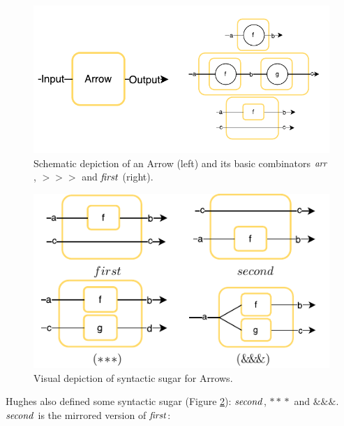 \documentclass[paper=A4,twoside=true,openright,parskip=full,chapterprefix=true,headings=normal,bibliography=totoc,listof=totoc,titlepage=on,captions=tableabove,draft=false,british]{scrreprt}%
\begin{document}
\begin{figure}
\centering
\includegraphics{src/img/arrows-viz.pdf}
\caption[Schematic depiction of an Arrow and its basic
combinators \ensuremath{\Varid{arr}}, \ensuremath{\mathbin{>\!\!>\!\!>}} and \ensuremath{\Varid{first}}.]{Schematic depiction of an Arrow (left) and its basic
combinators \ensuremath{\Varid{arr}}, \ensuremath{\mathbin{>\!\!>\!\!>}} and \ensuremath{\Varid{first}} (right).\label{fig:arrows-viz}}
\end{figure}

\begin{figure}
\centering
\includegraphics{src/img/syntacticSugarArrows.pdf}
\caption{Visual depiction of syntactic sugar for
Arrows.\label{fig:syntacticSugarArrows}}
\end{figure}

Hughes also defined some syntactic sugar (Figure
\ref{fig:syntacticSugarArrows}): \ensuremath{\Varid{second}}, \ensuremath{\mathbin{*\!*\!*}} and \ensuremath{\mathbin{\&\!\&\!\&}}. \ensuremath{\Varid{second}} is
the mirrored version of \ensuremath{\Varid{first}}:
\end{document}
